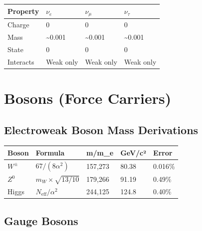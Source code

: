 \documentclass[
  11pt,
  letterpaper,
  twoside,
  openany]{book}
\makeatletter
\let\orig@section\section
\renewcommand{\section}{\needspace{8\baselineskip}\orig@section}
\let\orig@subsection\subsection
\renewcommand{\subsection}{\needspace{6\baselineskip}\orig@subsection}
\makeatother
\begin{document}
\begin{longtable}[]{@{}llll@{}}
\toprule\noalign{}
Property & \(\nu_e\) & \(\nu_\mu\) & \(\nu_\tau\) \\
\midrule\noalign{}
\endhead
\bottomrule\noalign{}
\endlastfoot
Charge & 0 & 0 & 0 \\
Mass & \textasciitilde0.001 & \textasciitilde0.001 &
\textasciitilde0.001 \\
State & 0 & 0 & 0 \\
Interacts & Weak only & Weak only & Weak only \\
\end{longtable}

\section{Bosons (Force Carriers)}\label{bosons-force-carriers}

\subsection{Electroweak Boson Mass
Derivations}\label{electroweak-boson-mass-derivations}

\begin{longtable}[]{@{}lllll@{}}
\toprule\noalign{}
Boson & Formula & m/m\_e & GeV/c² & Error \\
\midrule\noalign{}
\endhead
\bottomrule\noalign{}
\endlastfoot
\(W^\pm\) & \(67/(8\alpha^2)\) & 157,273 & 80.38 & 0.016\% \\
\(Z^0\) & \(m_W \times \sqrt{13/10}\) & 179,266 & 91.19 & 0.49\% \\
Higgs & \(N_{\text{eff}}/\alpha^2\) & 244,125 & 124.8 & 0.40\% \\
\end{longtable}

\subsection{Gauge Bosons}\label{gauge-bosons}
\end{document}
